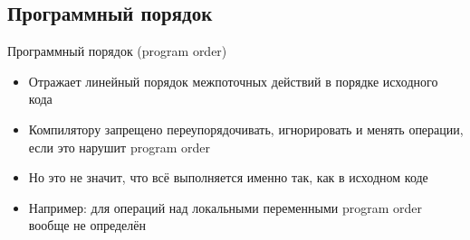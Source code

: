 \ifrender
\subsection{Программный порядок}
\begin{frame}{Программный порядок (program order)}
\begin{itemize}[<+->]
\item Отражает линейный порядок межпоточных действий в порядке исходного кода
\item Компилятору запрещено переупорядочивать, игнорировать и менять операции, если это нарушит program order
\item Но это не значит, что всё выполняется именно так, как в исходном коде
\item Например: для операций над локальными переменными program order вообще не определён
\end{itemize}
\end{frame}
\fi

